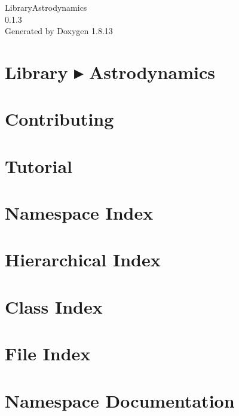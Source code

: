 \documentclass[twoside]{book}
\newcommand{\+}{\discretionary{\mbox{\scriptsize$\hookleftarrow$}}{}{}}
\newcommand{\clearemptydoublepage}{%
  \newpage{\pagestyle{empty}\cleardoublepage}%
}
\begin{document}
\hypersetup{pageanchor=false,
             bookmarksnumbered=true,
             pdfencoding=unicode
            }
\begin{titlepage}
\vspace*{7cm}
\begin{center}%
{\Large Library\+Astrodynamics \\[1ex]\large 0.\+1.\+3 }\\
\vspace*{1cm}
{\large Generated by Doxygen 1.8.13}\\
\end{center}
\end{titlepage}
\clearemptydoublepage
{}
\tableofcontents
\clearemptydoublepage
{}
\hypersetup{pageanchor=true}

\chapter{Library ▸ Astrodynamics}
\label{index}\hypertarget{index}{}
\chapter{Contributing}
\label{md__c_o_n_t_r_i_b_u_t_i_n_g}

\chapter{Tutorial}
\label{md_docs__tutorial}

\chapter{Namespace Index}

\chapter{Hierarchical Index}

\chapter{Class Index}

\chapter{File Index}

\chapter{Namespace Documentation}











\end{document}
